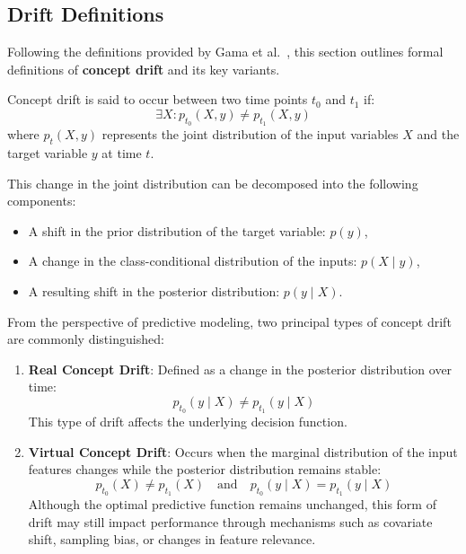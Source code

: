 \subsection*{Drift Definitions}\label{subsec:drift_definitions}
Following the definitions provided by Gama et
al.~\cite{drift_adaptation_survey}, this section outlines formal definitions of
\textbf{concept drift} and its key variants.

Concept drift is said to occur between two time points $t_0$ and $t_1$ if:
\begin{equation}
    \exists X : p_{t_0}(X, y) \neq p_{t_1}(X, y)
\end{equation}
where $p_t(X, y)$ represents the joint distribution of the input variables $X$
and the target variable $y$ at time $t$.

This change in the joint distribution can be decomposed into the following
components:
\begin{itemize}
    \item A shift in the prior distribution of the target variable: $p(y)$,
    \item A change in the class-conditional distribution of the inputs: $p(X \mid y)$,
    \item A resulting shift in the posterior distribution: $p(y \mid X)$.
\end{itemize}

From the perspective of predictive modeling, two principal types of concept
drift are commonly distinguished:

\begin{enumerate}
    \item \textbf{Real Concept Drift}: Defined as a change in the posterior
          distribution over time:
          \begin{equation}
              p_{t_0}(y \mid X) \neq p_{t_1}(y \mid X)
          \end{equation}
          This type of drift affects the underlying decision function.

    \item \textbf{Virtual Concept Drift}: Occurs when the marginal distribution
          of the input features changes while the posterior distribution remains stable:
          \begin{equation}
              p_{t_0}(X) \neq p_{t_1}(X) \quad \text{and} \quad p_{t_0}(y \mid X) =
              p_{t_1}(y \mid X)
          \end{equation}
          Although the optimal predictive function remains unchanged, this form
          of drift may still impact performance through mechanisms such as covariate
          shift, sampling bias, or changes in feature relevance.
\end{enumerate}

